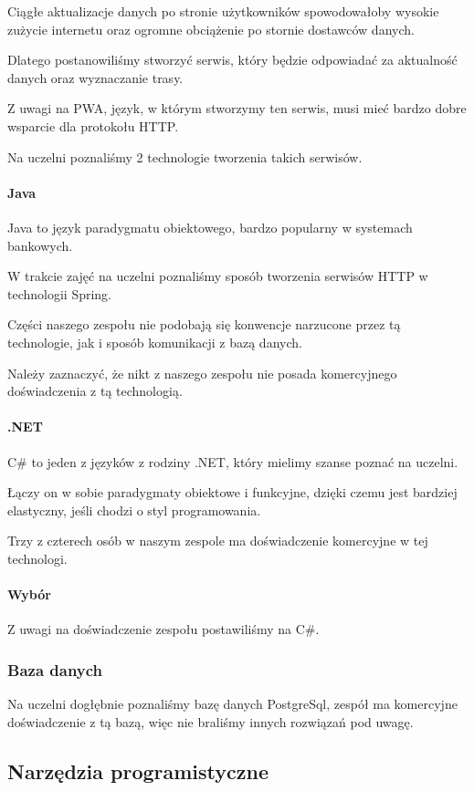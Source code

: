 Ciągłe aktualizacje danych po stronie użytkowników spowodowałoby wysokie zużycie internetu oraz ogromne obciążenie po stornie dostawców danych.

Dlatego postanowiliśmy stworzyć serwis, który będzie odpowiadać za aktualność danych oraz wyznaczanie trasy.

Z uwagi na PWA, język, w którym stworzymy ten serwis, musi mieć bardzo dobre wsparcie dla protokołu HTTP.

Na uczelni poznaliśmy 2 technologie tworzenia takich serwisów.

\paragraph{Java}
Java to język paradygmatu obiektowego, bardzo popularny w systemach bankowych.

W trakcie zajęć na uczelni poznaliśmy sposób tworzenia serwisów HTTP w technologii Spring.

Części naszego zespołu nie podobają się konwencje narzucone przez tą technologie, jak i sposób komunikacji z bazą danych.

Należy zaznaczyć, że nikt z naszego zespołu nie posada komercyjnego doświadczenia z tą technologią.

\paragraph{.NET}
C\# to jeden z języków z rodziny .NET, który mielimy szanse poznać na uczelni.

Łączy on w sobie paradygmaty obiektowe i funkcyjne, dzięki czemu jest bardziej elastyczny, jeśli chodzi o styl programowania.

Trzy z czterech osób w naszym zespole ma doświadczenie komercyjne w tej technologi.

\paragraph{Wybór}
Z uwagi na doświadczenie zespołu postawiliśmy na C\#.

\subsubsection{Baza danych}
Na uczelni dogłębnie poznaliśmy bazę danych PostgreSql, zespół ma komercyjne doświadczenie z tą bazą, więc nie braliśmy innych rozwiązań pod uwagę.

\subsection{Narzędzia programistyczne}
\label{subsec:narzedzia-programistyczne}

